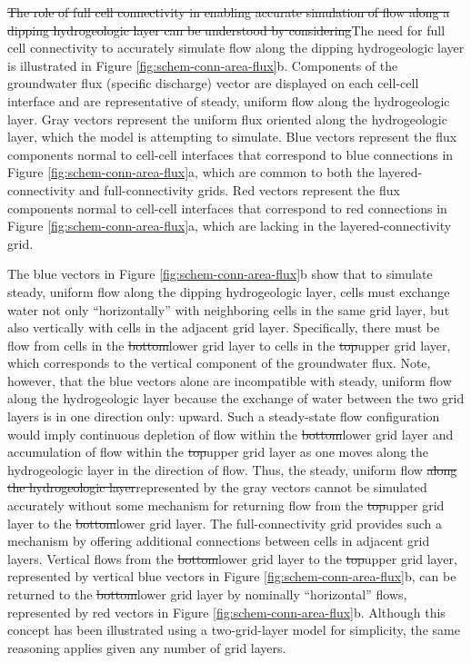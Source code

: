 \documentclass{article}
\begin{document}
{\color{red} \sout{The role of full cell connectivity in enabling accurate simulation of flow along a dipping hydrogeologic layer can be understood by considering}The need for full cell connectivity to accurately simulate flow along the dipping hydrogeologic layer is illustrated in} Figure \ref{fig:schem-conn-area-flux}b. Components of the groundwater flux (specific discharge) vector are displayed on each cell-cell interface and are representative of steady, uniform flow along the hydrogeologic layer. Gray vectors represent the uniform flux oriented along the hydrogeologic layer, which the model is attempting to simulate. Blue vectors represent the flux components normal to cell-cell interfaces that correspond to blue connections in Figure \ref{fig:schem-conn-area-flux}a, which are common to both the layered-connectivity and full-connectivity grids. Red vectors represent the flux components normal to cell-cell interfaces that correspond to red connections in Figure \ref{fig:schem-conn-area-flux}a, which are lacking in the layered-connectivity grid.

The blue vectors in Figure \ref{fig:schem-conn-area-flux}b show that to simulate steady, uniform flow along the dipping hydrogeologic layer, cells must exchange water not only ``horizontally'' with neighboring cells in the same grid layer, but also vertically with cells in the adjacent grid layer. Specifically, there must be flow from cells in the {\color{red} \sout{bottom}lower} grid layer to cells in the {\color{red} \sout{top}upper} grid layer, which corresponds to the vertical component of the groundwater flux. Note, however, that the blue vectors alone are incompatible with steady, uniform flow along the hydrogeologic layer because the exchange of water between the two grid layers is in one direction only: upward. Such a steady-state flow configuration would imply continuous depletion of flow within the {\color{red} \sout{bottom}lower} grid layer and accumulation of flow within the {\color{red} \sout{top}upper} grid layer as one moves along the hydrogeologic layer in the direction of flow. Thus, {\color{red} the} steady, uniform flow {\color{red} \sout{along the hydrogeologic layer}represented by the gray vectors} cannot be simulated accurately without some mechanism for returning flow from the {\color{red} \sout{top}upper} grid layer to the {\color{red} \sout{bottom}lower} grid layer. The full-connectivity grid provides such a mechanism by offering additional connections between cells in adjacent grid layers. Vertical flows from the {\color{red} \sout{bottom}lower} grid layer to the {\color{red} \sout{top}upper} grid layer, represented by vertical blue vectors in Figure \ref{fig:schem-conn-area-flux}b, can be returned to the {\color{red} \sout{bottom}lower} grid layer by nominally ``horizontal'' flows, represented by red vectors in Figure \ref{fig:schem-conn-area-flux}b. Although this concept has been illustrated using a two-grid-layer model for simplicity, the same reasoning applies given any number of grid layers.
\end{document}
